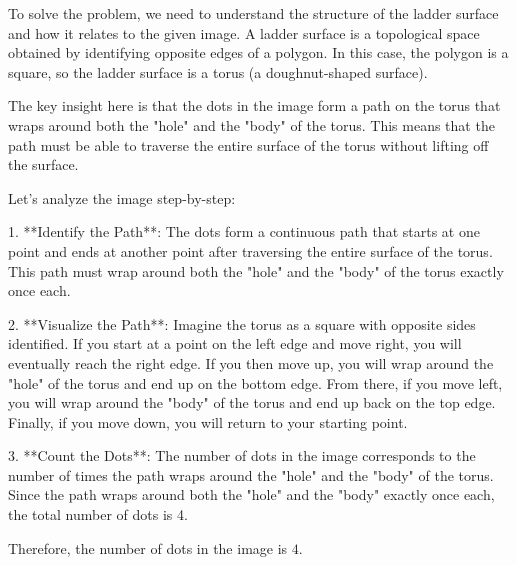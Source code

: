 To solve the problem, we need to understand the structure of the ladder surface and how it relates to the given image. A ladder surface is a topological space obtained by identifying opposite edges of a polygon. In this case, the polygon is a square, so the ladder surface is a torus (a doughnut-shaped surface).

The key insight here is that the dots in the image form a path on the torus that wraps around both the "hole" and the "body" of the torus. This means that the path must be able to traverse the entire surface of the torus without lifting off the surface.

Let's analyze the image step-by-step:

1. **Identify the Path**: The dots form a continuous path that starts at one point and ends at another point after traversing the entire surface of the torus. This path must wrap around both the "hole" and the "body" of the torus exactly once each.

2. **Visualize the Path**: Imagine the torus as a square with opposite sides identified. If you start at a point on the left edge and move right, you will eventually reach the right edge. If you then move up, you will wrap around the "hole" of the torus and end up on the bottom edge. From there, if you move left, you will wrap around the "body" of the torus and end up back on the top edge. Finally, if you move down, you will return to your starting point.

3. **Count the Dots**: The number of dots in the image corresponds to the number of times the path wraps around the "hole" and the "body" of the torus. Since the path wraps around both the "hole" and the "body" exactly once each, the total number of dots is 4.

Therefore, the number of dots in the image is \(\boxed{4}\).